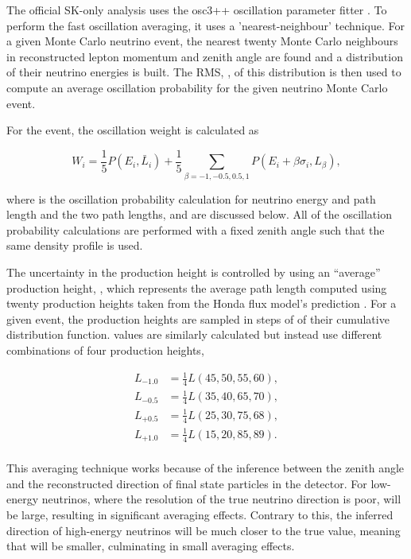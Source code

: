 The official SK-only analysis uses the osc3++ oscillation parameter fitter \cite{thesis_roger}. To perform the fast oscillation averaging, it uses a 'nearest-neighbour' technique. For a given Monte Carlo neutrino event, the nearest twenty Monte Carlo neighbours in reconstructed lepton momentum and zenith angle are found and a distribution of their neutrino energies is built. The RMS, \quickmath{\sigma}, of this distribution is then used to compute an average oscillation probability for the given neutrino Monte Carlo event. 

For the  event, the oscillation weight is calculated as

\begin{equation}
  W_{i} = \frac{1}{5} P(E_{i},\bar{L}_{i}) + \frac{1}{5} \sum_{\beta = -1, -0.5, 0.5, 1} P(E_{i} + \beta\sigma_{i},L_{\beta}),
\end{equation}

where  is the oscillation probability calculation for neutrino energy  and path length  and the two path lengths,  and  are discussed below. All of the oscillation probability calculations are performed with a fixed zenith angle such that the same density profile is used.

The uncertainty in the production height is controlled by using an ``average'' production height, , which represents the average path length computed using twenty production heights taken from the Honda flux model's prediction \cite{Honda:2011}. For a given event, the production heights are sampled in steps of  of their cumulative distribution function.  values are similarly calculated but instead use different combinations of four production heights,

\begin{equation}
  \begin{split}
    L_{-1.0} &= \frac{1}{4} L(45,50,55,60), \\
    L_{-0.5} &= \frac{1}{4} L(35,40,65,70), \\
    L_{+0.5} &= \frac{1}{4} L(25,30,75,68), \\
    L_{+1.0} &= \frac{1}{4} L(15,20,85,89). \\
  \end{split}
\end{equation}

This averaging technique works because of the inference between the zenith angle and the reconstructed direction of final state particles in the detector. For low-energy neutrinos, where the resolution of the true neutrino direction is poor,  will be large, resulting in significant averaging effects. Contrary to this, the inferred direction of high-energy neutrinos will be much closer to the true value, meaning that  will be smaller, culminating in small averaging effects.

